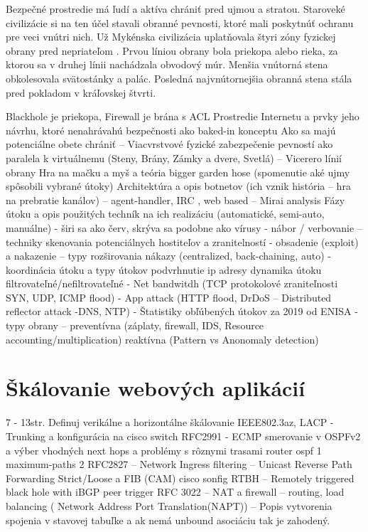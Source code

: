 \documentclass[12pt, a4paper]{article}
\begin{document}
Bezpečné prostredie má ľudí a aktíva chrániť pred ujmou a stratou. Staroveké civilizácie si na ten účel 
stavali obranné pevnosti, ktoré mali poskytnúť ochranu pre veci vnútri nich. Už Mykénska civilizácia 
uplatňovala štyri zóny fyzickej obrany pred nepriateľom \cite{physical-security}. Prvou líniou obrany
bola priekopa alebo rieka, za ktorou sa v druhej línii nachádzala obvodový múr. Menšia vnútorná stena
obkolesovala svätostánky a palác. Posledná najvnútornejšia obranná stena stála pred pokladom v kráľovskej 
štvrti. 

Blackhole je priekopa, Firewall je brána s ACL
Prostredie Internetu a prvky jeho návrhu, ktoré nenahrávahú bezpečnosti ako baked-in konceptu
Ako sa majú potenciálne obete chrániť – Viacvrstvové fyzické zabezpečenie pevností ako paralela k virtuálnemu (Steny, Brány, Zámky a dvere, Svetlá) – Vicerero línií obrany
Hra na mačku a myš a teória bigger garden hose (spomenutie aké ujmy spôsobili vybrané útoky)
Architektúra  a opis botnetov (ich vznik história – hra na prebratie kanálov) – agent-handler, IRC , web based – Mirai analysis
Fázy útoku a opis použitých techník na ich realizáciu (automatické, semi-auto, manuálne)
- širi sa ako červ, skrýva sa podobne ako vírusy
- nábor / verbovanie – techniky skenovania potenciálnych hostiteľov a zranitelností 
-  obsadenie (exploit) a nakazenie – typy rozširovania nákazy (centralized, back-chaining, auto)
-  koordinácia útoku a typy útokov
	podvrhnutie ip adresy
	dynamika útoku
	filtrovateľné/nefiltrovateľné
	- Net bandwitdh (TCP protokolové zraniteľnosti SYN, UDP, ICMP flood)
	- App attack (HTTP flood, DrDoS – Distributed reflector attack -DNS, NTP)
- Štatistiky obľúbených útokov za 2019 od ENISA
- typy obrany –
	preventívna (záplaty, firewall, IDS, Resource accounting/multiplication)
	reaktívna (Pattern vs Anonomaly detection)

\section{Škálovanie webových aplikácií}
7 - 13str.
Definuj verikálne a horizontálne škálovanie
IEEE802.3az, LACP - Trunking a konfigurácia na cisco switch
RFC2991 - ECMP smerovanie v OSPFv2 a výber vhodných next hops a problémy s rôznymi trasami
router ospf 1
maximum-paths 2
RFC2827 – Network Ingress filtering – Unicast Reverse Path Forwarding Strict/Loose a FIB (CAM)
cisco sonfig 
RTBH – Remotely triggered black hole with iBGP peer trigger
RFC 3022 – NAT a firewall – routing, load balancing ( Network Address Port Translation(NAPT)) – Popis vytvorenia spojenia v stavovej tabuľke a ak nemá unbound asociáciu tak je zahodený.
\end{document}
